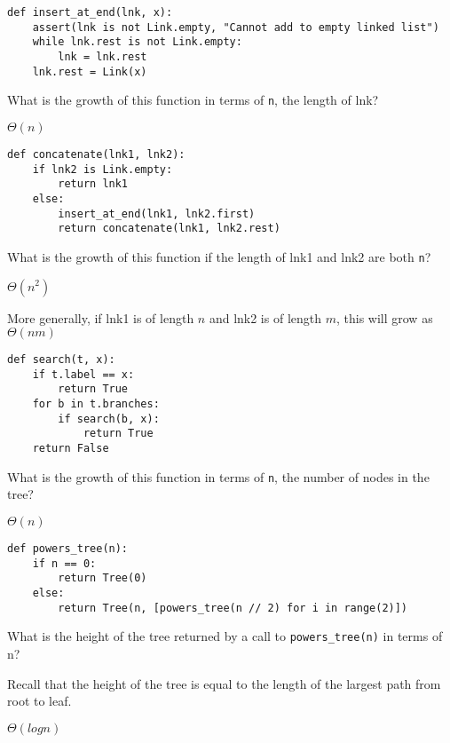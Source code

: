 \question
\begin{lstlisting}
def insert_at_end(lnk, x):
    assert(lnk is not Link.empty, "Cannot add to empty linked list")
    while lnk.rest is not Link.empty:
        lnk = lnk.rest
    lnk.rest = Link(x)
\end{lstlisting}
What is the growth of this function in terms of \texttt{n}, the length of lnk?
\begin{solution}[1in]
$\Theta(n)$
\end{solution}

\question
\begin{lstlisting}
def concatenate(lnk1, lnk2):
    if lnk2 is Link.empty:
        return lnk1
    else:
        insert_at_end(lnk1, lnk2.first)
        return concatenate(lnk1, lnk2.rest)
\end{lstlisting}
What is the growth of this function if the length of lnk1 and lnk2 are both \texttt{n}?
\begin{solution}[.5in]
$\Theta(n^2)$

More generally, if lnk1 is of length $n$ and lnk2 is of length $m$, this will grow as
$\Theta(nm)$
\end{solution}

\newpage 

\question
\begin{lstlisting}
def search(t, x):
    if t.label == x:
        return True
    for b in t.branches:
        if search(b, x):
            return True
    return False
\end{lstlisting}
What is the growth of this function in terms of \texttt{n}, the number of nodes in the tree?
\begin{solution}[1in]
$\Theta(n)$
\end{solution}

\question
\begin{lstlisting}
def powers_tree(n):
    if n == 0:
        return Tree(0)
    else:
        return Tree(n, [powers_tree(n // 2) for i in range(2)])
\end{lstlisting}
What is the height of the tree returned by a call to \texttt{powers\_tree(n)} in terms of n?

Recall that the height of the tree is equal to the length of the largest path from root to leaf.
\begin{solution}[1in]
$\Theta(log n)$
\end{solution}